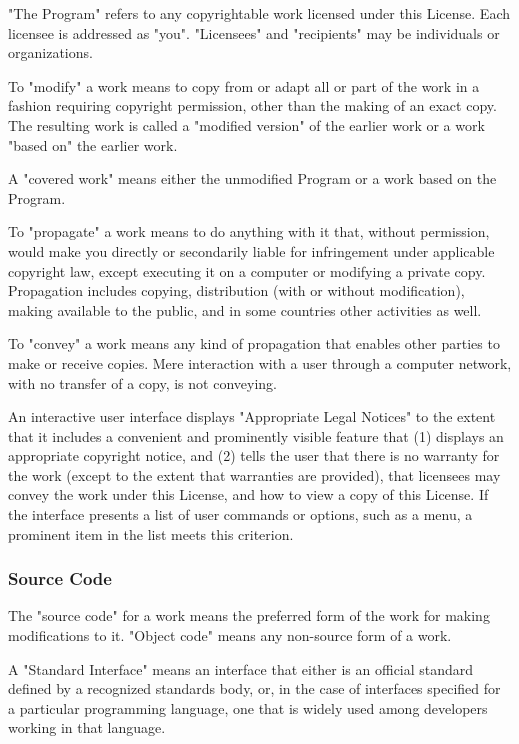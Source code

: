 \documentclass{ctexart}
\begin{document}
  "The Program" refers to any copyrightable work licensed under this
License.  Each licensee is addressed as "you".  "Licensees" and
"recipients" may be individuals or organizations.

  To "modify" a work means to copy from or adapt all or part of the work
in a fashion requiring copyright permission, other than the making of an
exact copy.  The resulting work is called a "modified version" of the
earlier work or a work "based on" the earlier work.

  A "covered work" means either the unmodified Program or a work based
on the Program.

  To "propagate" a work means to do anything with it that, without
permission, would make you directly or secondarily liable for
infringement under applicable copyright law, except executing it on a
computer or modifying a private copy.  Propagation includes copying,
distribution (with or without modification), making available to the
public, and in some countries other activities as well.

  To "convey" a work means any kind of propagation that enables other
parties to make or receive copies.  Mere interaction with a user through
a computer network, with no transfer of a copy, is not conveying.

  An interactive user interface displays "Appropriate Legal Notices"
to the extent that it includes a convenient and prominently visible
feature that (1) displays an appropriate copyright notice, and (2)
tells the user that there is no warranty for the work (except to the
extent that warranties are provided), that licensees may convey the
work under this License, and how to view a copy of this License.  If
the interface presents a list of user commands or options, such as a
menu, a prominent item in the list meets this criterion.

\subsubsection{Source Code}

  The "source code" for a work means the preferred form of the work
for making modifications to it.  "Object code" means any non-source
form of a work.

  A "Standard Interface" means an interface that either is an official
standard defined by a recognized standards body, or, in the case of
interfaces specified for a particular programming language, one that
is widely used among developers working in that language.
\end{document}
